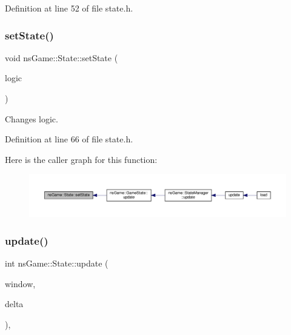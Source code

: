Definition at line 52 of file state.\+h.

\mbox{\label{structns_game_1_1_state_adab442cc7a1edda5adaa55e8d510633f}} 
\subsubsection{\texorpdfstring{set\+State()}{setState()}}
{\footnotesize\ttfamily void ns\+Game\+::\+State\+::set\+State (\begin{DoxyParamCaption}\item[{int}]{logic }\end{DoxyParamCaption})\hspace{0.3cm}{\ttfamily [inline]}}



Changes logic. 



Definition at line 66 of file state.\+h.

Here is the caller graph for this function\+:\nopagebreak
\begin{figure}[H]
\begin{center}
\leavevmode
\includegraphics[width=350pt]{structns_game_1_1_state_adab442cc7a1edda5adaa55e8d510633f_icgraph}
\end{center}
\end{figure}
\mbox{\label{structns_game_1_1_state_ae809e89ac9df4a43ab90d5d5932e2bc7}} 
\subsubsection{\texorpdfstring{update()}{update()}}
{\footnotesize\ttfamily int ns\+Game\+::\+State\+::update (\begin{DoxyParamCaption}\item[{Min\+GL \&}]{window,  }\item[{unsigned}]{delta }\end{DoxyParamCaption})\hspace{0.3cm}{\ttfamily [inline]}, {\ttfamily [virtual]}}



